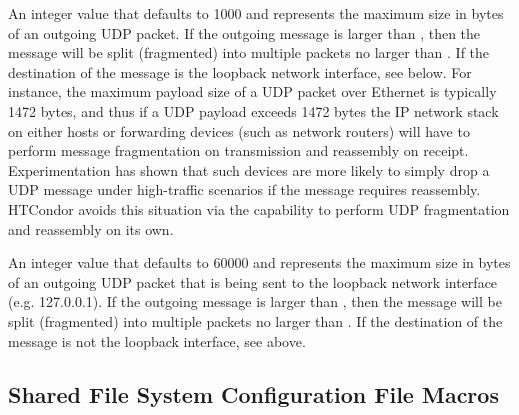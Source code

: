 \begin{description}
\label{param:UdpNetworkFragmentSize}
\item[\Macro{UDP\_NETWORK\_FRAGMENT\_SIZE}]
	An integer value that defaults to 1000 and represents the maximum
	size in bytes of an outgoing UDP packet.  If the outgoing message
	is larger than , then the message
	will be split (fragmented) into multiple packets no larger than
	. If the destination of the message
	is the loopback network interface, see 
	 below. 
	For instance, the maximum payload size of a UDP packet over Ethernet
	is typically 1472 bytes, and thus if a UDP payload exceeds 1472 bytes 
	the IP network stack on either hosts or forwarding devices (such
	as network routers) will have to perform message fragmentation 
	on transmission and reassembly on receipt.  Experimentation
	has shown that such devices are more likely to simply drop a UDP message
	under high-traffic scenarios if the message requires reassembly.  
	HTCondor avoids this situation via the capability to
	perform UDP fragmentation and reassembly on its own. 

\label{param:UdpLoopbackFragmentSize}
\item[\Macro{UDP\_LOOPBACK\_FRAGMENT\_SIZE}]
	An integer value that defaults to 60000 and represents the maximum
	size in bytes of an outgoing UDP packet that is being sent
	to the loopback network interface (e.g. 127.0.0.1).  
	If the outgoing message
	is larger than , then the message
	will be split (fragmented) into multiple packets no larger than
	.
	If the destination of the message is not the loopback interface,
	see  above.
\end{description}

\subsection{\label{sec:Shared-Filesystem-Config-File-Entries}Shared File System Configuration File Macros} 

